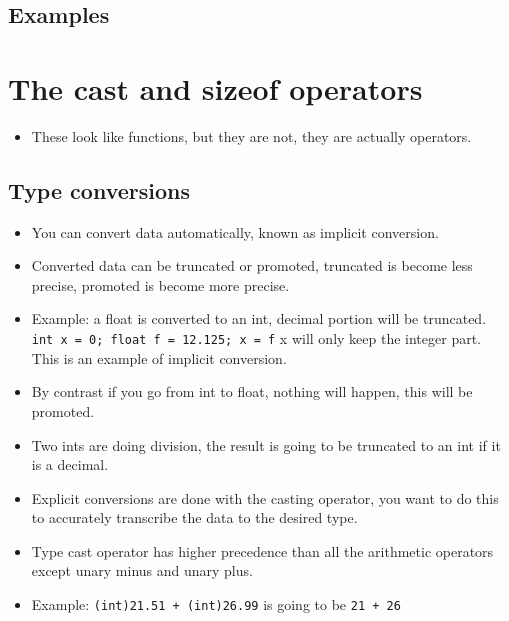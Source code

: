 \subsection{Examples}


\section{The cast and sizeof operators}
\begin{itemize}
    \item These look like functions, but they are not, they are actually operators.
\end{itemize}
\subsection{Type conversions}
\begin{itemize}
    \item You can convert data automatically, known as implicit conversion. 
    \item Converted data can be truncated or promoted, truncated is become less precise, promoted is become more precise. 
    \item Example: a float is converted to an int, decimal portion will be truncated. \texttt{int x = 0; float f = 12.125; x = f} x will only keep the integer part. This is an example of implicit conversion. 
    \item By contrast if you go from int to float, nothing will happen, this will be promoted. 
    \item Two ints are doing division, the result is going to be truncated to an int if it is a decimal. 
    \item Explicit conversions are done with the casting operator, you want to do this to accurately transcribe the data to the desired type. 
    \item Type cast operator has higher precedence than all the arithmetic operators except unary minus and unary plus. 
    \item Example: \texttt{(int)21.51 + (int)26.99} is going to be \texttt{21 + 26}
\end{itemize}
